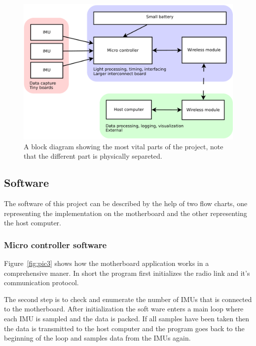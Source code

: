 \documentclass[a4paper, 12pt]{article}
\begin{document}
\begin{figure}[h!]
    \centering
    \includegraphics[scale=0.38]{block.pdf}
    \caption{A block diagram showing the most vital parts of the project, note that the different part is physically separeted.}
    \label{fig:pic2}
\end{figure}
\newpage

\subsection*{Software}
The software of this project can be described by the help of two flow charts, one representing the implementation on the motherboard and the other representing the host computer.

\subsubsection*{Micro controller software}
Figure~\ref{fig:pic3} shows how the motherboard application works in a comprehensive maner. In short the program first initializes the radio link and it's communication protocol. 

The second step is to check and enumerate the number of IMUs that is connected to the motherboard. After initialization the soft ware enters a main loop where each IMU is sampled and the data is packed. If all samples have been taken then the data is transmitted to the host computer and the program goes back to the beginning of the loop and samples data from the IMUs again.    
\end{document}
